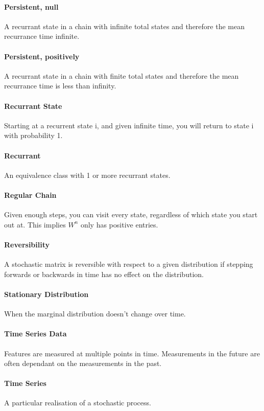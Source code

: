 \documentclass[12pt]{article}
\begin{document}
    \paragraph{Persistent, null} A recurrant state in a chain with infinite total states and therefore the mean recurrance time infinite.
    \paragraph{Persistent, positively} A recurrant state in a chain with finite total states and therefore the mean recurrance time is less than infinity.
    \paragraph{Recurrant State} Starting at a recurrent state i, and given infinite time, you will return to state i with probability 1.
    \paragraph{Recurrant} An equivalence class with 1 or more recurrant states.
    \paragraph{Regular Chain} Given enough steps, you can visit every state, regardless of which state you start out at. This implies \(W^n\) only has positive entries.
    \paragraph{Reversibility} A stochastic matrix is reversible with respect to a given distribution if stepping forwards or backwards in time has no effect on the distribution.
    \paragraph{Stationary Distribution} When the marginal distribution doesn't change over time.
    \paragraph{Time Series Data} Features are measured at multiple points in time. Measurements in the future are often dependant on the measurements in the past.
    \paragraph{Time Series} A particular realisation of a stochastic process.
\end{document}
